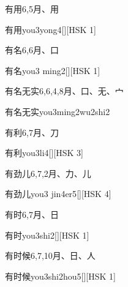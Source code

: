 \begin{entry}{有用}{6,5}{⽉、⽤}
  \begin{phonetics}{有用}{you3yong4}[][HSK 1]
  \end{phonetics}
\end{entry}

\begin{entry}{有名}{6,6}{⽉、⼝}
  \begin{phonetics}{有名}{you3 ming2}[][HSK 1]
  \end{phonetics}
\end{entry}

\begin{entry}{有名无实}{6,6,4,8}{⽉、⼝、⽆、⼧}
  \begin{phonetics}{有名无实}{you3ming2wu2shi2}
  \end{phonetics}
\end{entry}

\begin{entry}{有利}{6,7}{⽉、⼑}
  \begin{phonetics}{有利}{you3li4}[][HSK 3]
  \end{phonetics}
\end{entry}

\begin{entry}{有劲儿}{6,7,2}{⽉、⼒、⼉}
  \begin{phonetics}{有劲儿}{you3 jin4er5}[][HSK 4]
  \end{phonetics}
\end{entry}

\begin{entry}{有时}{6,7}{⽉、⽇}
  \begin{phonetics}{有时}{you3shi2}[][HSK 1]
  \end{phonetics}
\end{entry}

\begin{entry}{有时候}{6,7,10}{⽉、⽇、⼈}
  \begin{phonetics}{有时候}{you3shi2hou5}[][HSK 1]
  \end{phonetics}
\end{entry}

